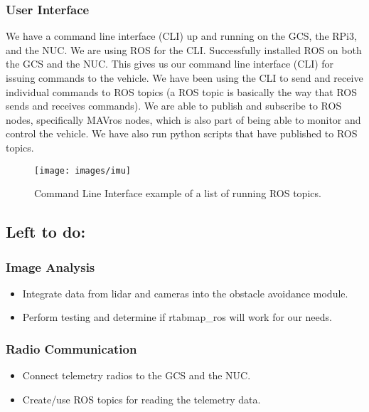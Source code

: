 \documentclass[compsoc,draftclsnofoot,onecolumn,10pt]{IEEEtran}
\begin{document}
\subsubsection{User Interface}
We have a command line interface (CLI) up and running on the GCS, the RPi3, and the NUC. We are using ROS for the CLI. 
Successfully installed ROS on both the GCS and the NUC. This gives us our command line interface (CLI) for issuing commands to the vehicle. We have been using the CLI to send and receive individual commands to ROS topics (a ROS topic is basically the way that ROS sends and receives commands). We are able to publish and subscribe to ROS nodes, specifically MAVros nodes, which is also part of being able to monitor and control the vehicle. We have also run python scripts that have published to ROS topics.\par

\begin{figure}[H]
	\texttt{[image: images/imu]}
	\caption{Command Line Interface example of a list of running ROS topics.}
\end{figure}



\subsection{Left to do:}
\subsubsection{Image Analysis}
\begin{itemize}
	\item Integrate data from lidar and cameras into the obstacle avoidance module.
	\item Perform testing and determine if rtabmap\_ros will work for our needs.
\end{itemize}

\subsubsection{Radio Communication}
\begin{itemize}
	\item Connect telemetry radios to the GCS and the NUC.
	\item Create/use ROS topics for reading the telemetry data.
\end{itemize}
\end{document}
